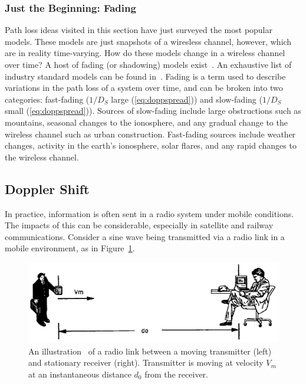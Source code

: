 \subsubsection{Just the Beginning: Fading}
Path loss ideas visited in this section have just surveyed the most popular models. These models are just snapshots of a wiresless channel, however, which are in reality time-varying. How do these models change in a wireless channel over time? A host of fading (or shadowing) models exist~\cite{tsb88tia,rappaport1996wireless,pahlavan2005wireless}. An exhaustive list of industry standard models can be found in~\cite{tsb88tia}. Fading is a term used to describe variations in the path loss of a system over time, and can be broken into two categories: fast-fading ($1/D_S$ large (\ref{eq:doppspread})) and slow-fading ($1/D_S$ small (\ref{eq:doppspread})). Sources of slow-fading include large obstructions such as mountains, seasonal changes to the ionosphere, and any gradual change to the wireless channel such as urban construction.  Fast-fading sources include weather changes, activity in the earth's ionosphere, solar flares, and any rapid changes to the wireless channel.

\subsection{Doppler Shift}
\label{doppshift}
In practice, information is often sent in a radio system under mobile conditions. The impacts of this can be considerable, especially in satellite and railway communications. Consider a sine wave being transmitted via a radio link in a mobile environment, as in Figure~\ref{fig:mobil_illust}.

\FloatBarrier
\begin{figure}[ht!]
	\centering	\includegraphics[width=1\textwidth,keepaspectratio]{figs/doppler_graphic.png}
    \caption{An illustration~\cite{pahlavan2005wireless} of a radio link between a moving transmitter (left) and stationary receiver (right). Transmitter is moving at velocity $V_m$ at an instantaneous distance $d_0$ from the receiver.} 
\label{fig:mobil_illust}      
\end{figure}
\FloatBarrier

